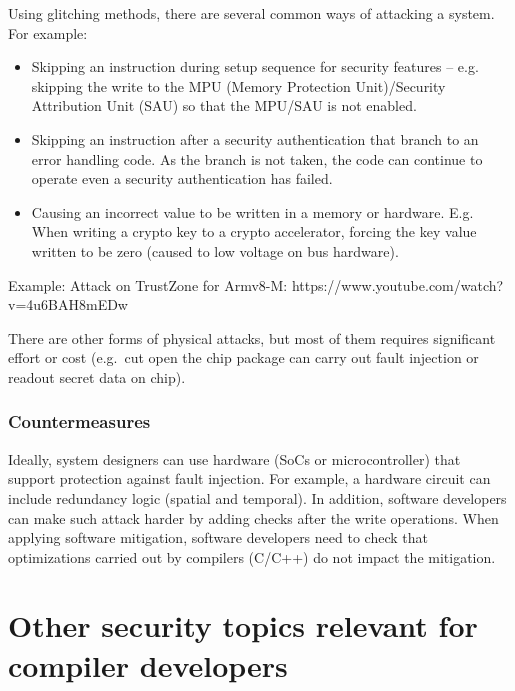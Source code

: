 \documentclass[
  a4paper,
]{report}
\providecommand{\tightlist}{%
  \setlength{\itemsep}{0pt}\setlength{\parskip}{0pt}}
\begin{document}
Using glitching methods, there are several common ways of attacking a
system. For example:

\begin{itemize}
\tightlist
\item
  Skipping an instruction during setup sequence for security features --
  e.g. skipping the write to the MPU (Memory Protection Unit)/Security
  Attribution Unit (SAU) so that the MPU/SAU is not enabled.
\item
  Skipping an instruction after a security authentication that branch to
  an error handling code. As the branch is not taken, the code can
  continue to operate even a security authentication has failed.
\item
  Causing an incorrect value to be written in a memory or hardware. E.g.
  When writing a crypto key to a crypto accelerator, forcing the key
  value written to be zero (caused to low voltage on bus hardware).
\end{itemize}

Example: Attack on TrustZone for Armv8-M:
https://www.youtube.com/watch?v=4u6BAH8mEDw

There are other forms of physical attacks, but most of them requires
significant effort or cost (e.g.~cut open the chip package can carry out
fault injection or readout secret data on chip).

\hypertarget{countermeasures-1}{%
\subsection{Countermeasures}\label{countermeasures-1}}

Ideally, system designers can use hardware (SoCs or microcontroller)
that support protection against fault injection. For example, a hardware
circuit can include redundancy logic (spatial and temporal). In
addition, software developers can make such attack harder by adding
checks after the write operations. When applying software mitigation,
software developers need to check that optimizations carried out by
compilers (C/C++) do not impact the mitigation.

\hypertarget{other-security-topics-relevant-for-compiler-developers}{%
\chapter{Other security topics relevant for compiler
developers}\label{other-security-topics-relevant-for-compiler-developers}}
\end{document}
